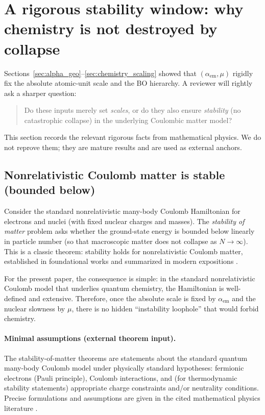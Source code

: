 \section{A rigorous stability window: why chemistry is not destroyed by collapse}
\label{sec:stability_window}

Sections~\ref{sec:alpha_geo}--\ref{sec:chemistry_scaling} showed that $(\alpha_{\mathrm{em}},\mu)$ rigidly fix the absolute atomic-unit scale and the BO hierarchy. A reviewer will rightly ask a sharper question:
\begin{quote}
Do these inputs merely set \emph{scales}, or do they also ensure \emph{stability} (no catastrophic collapse) in the underlying Coulombic matter model?
\end{quote}
This section records the relevant rigorous facts from mathematical physics. We do not reprove them; they are mature results and are used as external anchors.

\subsection{Nonrelativistic Coulomb matter is stable (bounded below)}
Consider the standard nonrelativistic many-body Coulomb Hamiltonian for electrons and nuclei (with fixed nuclear charges and masses). The \emph{stability of matter} problem asks whether the ground-state energy is bounded below linearly in particle number (so that macroscopic matter does not collapse as $N\to\infty$). This is a classic theorem: stability holds for nonrelativistic Coulomb matter, established in foundational works and summarized in modern expositions \cite{DysonLenard1967,DysonLenard1968,LiebThirring1975,LiebSeiringer2010}.

For the present paper, the consequence is simple: in the standard nonrelativistic Coulomb model that underlies quantum chemistry, the Hamiltonian is well-defined and extensive. Therefore, once the absolute scale is fixed by $\alpha_{\mathrm{em}}$ and the nuclear slowness by $\mu$, there is no hidden ``instability loophole'' that would forbid chemistry.

\paragraph{Minimal assumptions (external theorem input).}
The stability-of-matter theorems are statements about the standard quantum many-body Coulomb model under physically standard hypotheses: fermionic electrons (Pauli principle), Coulomb interactions, and (for thermodynamic stability statements) appropriate charge constraints and/or neutrality conditions. Precise formulations and assumptions are given in the cited mathematical physics literature \cite{LiebSeiringer2010}.

